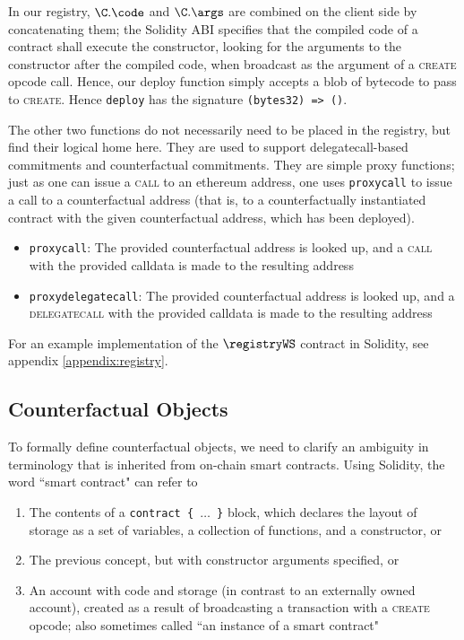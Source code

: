 \documentclass[prb,floatfix,reprint,nofootinbib,amsmath,amssymb,epsfig,pre,floats,letterpaper,groupedaffiliation,tightenlines,allcolors=blue,11pt]{revtex4}
\theoremstyle{definition}
\theoremstyle{definition}
\theoremstyle{definition}
\begin{document}
In our registry, $\C.\code$ and $\C.\args$ are combined on the client side by concatenating them; the Solidity ABI specifies that the compiled code of a contract shall execute the constructor, looking for the arguments to the constructor after the compiled code, when broadcast as the argument of a \textsc{create} opcode call. Hence, our \textsf{deploy} function simply accepts a blob of bytecode to pass to \textsc{create}. Hence \texttt{deploy} has the signature \texttt{(bytes32) => ()}.

The other two functions do not necessarily need to be placed in the registry, but find their logical home here. They are used to support delegatecall-based commitments and counterfactual commitments. They are simple proxy functions; just as one can issue a \textsc{call} to an ethereum address, one uses \texttt{proxycall} to issue a call to a counterfactual address (that is, to a counterfactually instantiated contract with the given counterfactual address, which has been deployed).

\begin{itemize}
\setlength\itemsep{0em}
\item \texttt{proxycall}: The provided counterfactual address is looked up, and a \textsc{call} with the provided calldata is made to the resulting address
\item \texttt{proxydelegatecall}: The provided counterfactual address is looked up, and a \textsc{delegatecall} with the provided calldata is made to the resulting address
\end{itemize}

For an example implementation of the $\registryWS$ contract in Solidity, see appendix \ref{appendix:registry}.

\subsection{Counterfactual Objects}

To formally define counterfactual objects, we need to clarify an ambiguity in terminology that is inherited from on-chain smart contracts. Using Solidity, the word ``smart contract" can refer to

\begin{enumerate}
\item The contents of a \texttt{contract \{ $\ldots$ \}} block, which declares the layout of storage as a set of variables, a collection of functions, and a constructor, or
\item The previous concept, but with constructor arguments specified, or
\item An account with code and storage (in contrast to an externally owned account), created as a result of broadcasting a transaction with a \textsc{create} opcode; also sometimes called ``an instance of a smart contract"
\end{enumerate}
\end{document}

